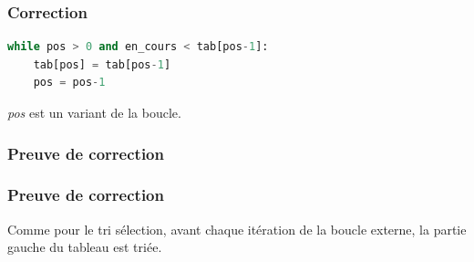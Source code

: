 \documentclass[svgnames,11pt]{beamer}
\begin{document}
\begin{frame}[fragile]
    \frametitle{Correction}

\begin{center}
\begin{lstlisting}[language=Python, basicstyle=\small, xrightmargin=1em]
while pos > 0 and en_cours < tab[pos-1]:
    tab[pos] = tab[pos-1]
    pos = pos-1
\end{lstlisting}
\end{center}

    \emph{pos} est un variant de la boucle. 
\end{frame} 

\subsubsection{Preuve de correction}
\begin{frame}
    \frametitle{Preuve de correction}

    Comme pour le tri sélection, avant chaque itération de la boucle externe, la partie gauche du tableau est triée.

    \begin{center}
        \label{CODE}
        \end{center}

\end{frame}
\end{document}
